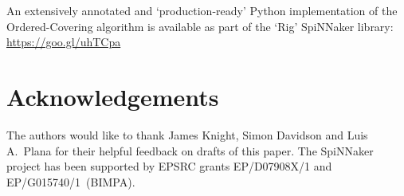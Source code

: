 \documentclass[conference]{IEEEtran}
\begin{document}
\noindent An extensively annotated and `production-ready' Python implementation of the Ordered-Covering algorithm is available as part of the `Rig' SpiNNaker library: \url{https://goo.gl/uhTCpa}

\section*{Acknowledgements}

\noindent The authors would like to thank James Knight, Simon Davidson and Luis A.\ Plana for their helpful feedback on drafts of this paper.
The SpiNNaker project has been supported by EPSRC grants EP/D07908X/1 and EP/G015740/1~(BIMPA).

\printbibliography
\end{document}
